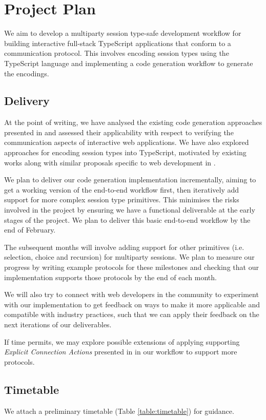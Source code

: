 
\chapter{Project Plan}
We aim to develop a multiparty session type-safe development workflow for building interactive full-stack TypeScript applications that conform to a communication protocol. This involves encoding session types using the TypeScript language and implementing a code generation workflow to generate the encodings.

\section{Delivery}
At the point of writing, we have analysed the existing code generation approaches presented in \cite{Hybrid2016, Scribble, Python2017} and assessed their applicability with respect to verifying the communication aspects of interactive web applications. We have also explored approaches for encoding session types into TypeScript, motivated by existing works along with similar proposals specific to web development in \cite{PureScript2019, MVU2019}.

We plan to deliver our code generation implementation incrementally, aiming to get a working version of the end-to-end workflow first, then iteratively add support for more complex session type primitives. This minimises the risks involved in the project by ensuring we have a functional deliverable at the early stages of the project. We plan to deliver this basic end-to-end workflow by the end of February.

The subsequent months will involve adding support for other primitives (i.e. selection, choice and recursion) for multiparty sessions. We plan to measure our progress by writing example protocols for these milestones and checking that our implementation supports those protocols by the end of each month.

We will also try to connect with web developers in the community to experiment with our implementation to get feedback on ways to make it more applicable and compatible with industry practices, such that we can apply their feedback on the next iterations of our deliverables.

If time permits, we may explore possible extensions of applying supporting \textit{Explicit Connection Actions} presented in \cite{FASE2017} in our workflow to support more protocols.

\section{Timetable}
We attach a preliminary timetable (Table \ref{table:timetable}) for guidance.

